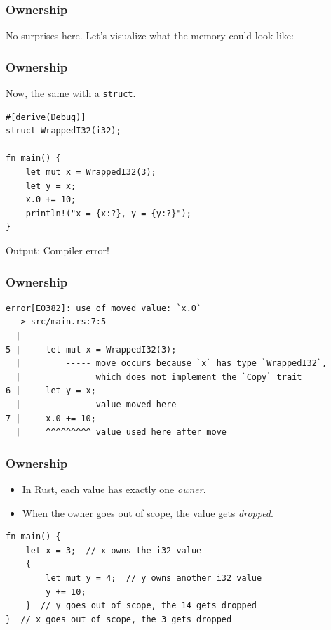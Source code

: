 \begin{frame}[fragile]
    \frametitle{Ownership}
    No surprises here. Let's visualize what the memory could look like:
    \pause
    \vfill
    \begin{center}
    \end{center}
\end{frame}

\begin{frame}[fragile]
    \frametitle{Ownership}
    Now, the same with a \texttt{struct}.
    \vfill
    \begin{verbatim}
#[derive(Debug)]
struct WrappedI32(i32);

fn main() {
    let mut x = WrappedI32(3);
    let y = x;
    x.0 += 10;
    println!("x = {x:?}, y = {y:?}");
}
    \end{verbatim}
    \pause
    \vfill
    Output:
    \pause
    Compiler error!
\end{frame}

\begin{frame}[fragile]
    \frametitle{Ownership}
    \begin{verbatim}
error[E0382]: use of moved value: `x.0`
 --> src/main.rs:7:5
  |
5 |     let mut x = WrappedI32(3);
  |         ----- move occurs because `x` has type `WrappedI32`,
  |               which does not implement the `Copy` trait
6 |     let y = x;
  |             - value moved here
7 |     x.0 += 10;
  |     ^^^^^^^^^ value used here after move
    \end{verbatim}
\end{frame}

\begin{frame}[fragile]
    \frametitle{Ownership}
    \begin{itemize}
        \item In Rust, each value has exactly one \textit{owner}.
        \item When the owner goes out of scope, the value gets \textit{dropped}.
    \end{itemize}
    \pause
    \vfill
    \begin{verbatim}
fn main() {
    let x = 3;  // x owns the i32 value
    {
        let mut y = 4;  // y owns another i32 value
        y += 10;
    }  // y goes out of scope, the 14 gets dropped
}  // x goes out of scope, the 3 gets dropped
    \end{verbatim}
\end{frame}

